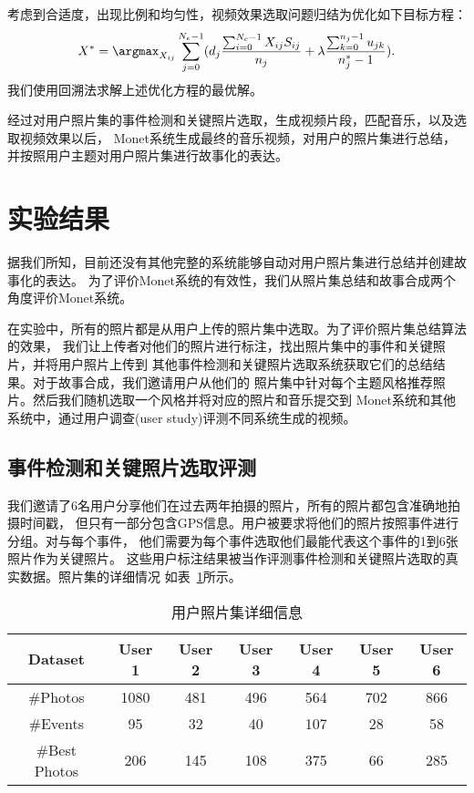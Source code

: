 考虑到合适度，出现比例和均匀性，视频效果选取问题归结为优化如下目标方程：
\begin{eqnarray}
    X^* = \argmax_{X_{ij}}
    \sum_{j=0}^{N_e-1}(d_j\frac{\sum_{i=0}^{N_c-1}X_{ij}S_{ij}}{n_j}
    + \lambda \frac{\sum_{k=0}^{n_j-1}u_{jk}}{n_j^*-1}).
\end{eqnarray}
我们使用回溯法求解上述优化方程的最优解。

经过对用户照片集的事件检测和关键照片选取，生成视频片段，匹配音乐，以及选取视频效果以后，
Monet系统生成最终的音乐视频，对用户的照片集进行总结，并按照用户主题对用户照片集进行故事化的表达。

\section{实验结果}
据我们所知，目前还没有其他完整的系统能够自动对用户照片集进行总结并创建故事化的表达。
为了评价Monet系统的有效性，我们从照片集总结和故事合成两个角度评价Monet系统。

在实验中，所有的照片都是从用户上传的照片集中选取。为了评价照片集总结算法的效果，
我们让上传者对他们的照片进行标注，找出照片集中的事件和关键照片，并将用户照片上传到
其他事件检测和关键照片选取系统获取它们的总结结果。对于故事合成，我们邀请用户从他们的
照片集中针对每个主题风格推荐照片。然后我们随机选取一个风格并将对应的照片和音乐提交到
Monet系统和其他系统中，通过用户调查(user study)评测不同系统生成的视频。

\subsection{事件检测和关键照片选取评测}
我们邀请了6名用户分享他们在过去两年拍摄的照片，所有的照片都包含准确地拍摄时间戳，
但只有一部分包含GPS信息。用户被要求将他们的照片按照事件进行分组。对与每个事件，
他们需要为每个事件选取他们最能代表这个事件的1到6张照片作为关键照片。
这些用户标注结果被当作评测事件检测和关键照片选取的真实数据。照片集的详细情况
如表~\ref{tab:monet-photos-info}所示。
\begin{table}[htbp]
    \centering
    \caption{用户照片集详细信息} \label{tab:monet-photos-info}
    \begin{tabular}{|c|c|c|c|c|c|c|}
        \hline
        Dataset & User 1 & User 2 & User 3 &  User 4 &User 5 & User 6\\ \hline
        \#Photos & 1080 & 481 & 496 &  564 & 702 & 866 \\ \hline
        \#Events & 95 & 32 & 40 &  107 & 28 & 58 \\ \hline
        \#Best Photos & 206 & 145 & 108 &  375 & 66 & 285 \\ \hline
    \end{tabular}
\end{table}


